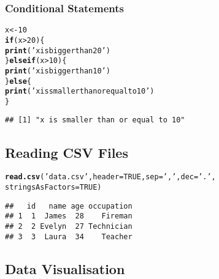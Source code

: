 \documentclass[../../dsa1101_notes.Rtex]{subfiles}\usepackage[]{graphicx}\usepackage[]{color}
\makeatletter
\newcommand{\hlnum}[1]{\textcolor[rgb]{0.686,0.059,0.569}{#1}}%
\newcommand{\hlstr}[1]{\textcolor[rgb]{0.192,0.494,0.8}{#1}}%
\newcommand{\hlopt}[1]{\textcolor[rgb]{0,0,0}{#1}}%
\newcommand{\hlstd}[1]{\textcolor[rgb]{0.345,0.345,0.345}{#1}}%
\newcommand{\hlkwa}[1]{\textcolor[rgb]{0.161,0.373,0.58}{\textbf{#1}}}%
\newcommand{\hlkwb}[1]{\textcolor[rgb]{0.69,0.353,0.396}{#1}}%
\newcommand{\hlkwc}[1]{\textcolor[rgb]{0.333,0.667,0.333}{#1}}%
\newcommand{\hlkwd}[1]{\textcolor[rgb]{0.737,0.353,0.396}{\textbf{#1}}}%
\newenvironment{kframe}{%
 \def\at@end@of@kframe{}%
 \ifinner\ifhmode%
  \def\at@end@of@kframe{\end{minipage}}%
  \begin{minipage}{\columnwidth}%
 \fi\fi%
 \def\FrameCommand##1{\hskip\@totalleftmargin \hskip-\fboxsep
 \colorbox{shadecolor}{##1}\hskip-\fboxsep
     \hskip-\linewidth \hskip-\@totalleftmargin \hskip\columnwidth}%
 \MakeFramed {\advance\hsize-\width
   \@totalleftmargin\z@ \linewidth\hsize
   \@setminipage}}%
 {\par\unskip\endMakeFramed%
 \at@end@of@kframe}
\newenvironment{knitrout}{}{} %
\makeatother
\begin{document}
\subsubsection{Conditional Statements}
\begin{knitrout}
\color{fgcolor}\begin{kframe}
\begin{alltt}
  \hlstd{x} \hlkwb{<-} \hlnum{10}
\hlkwa{if} \hlstd{(x} \hlopt{>} \hlnum{20}\hlstd{) \{}
  \hlkwd{print}\hlstd{(}\hlstr{'x is bigger than 20'}\hlstd{)}
\hlstd{\}} \hlkwa{else if} \hlstd{(x} \hlopt{>} \hlnum{10}\hlstd{) \{}
  \hlkwd{print}\hlstd{(}\hlstr{'x is bigger than 10'}\hlstd{)}
\hlstd{\}} \hlkwa{else} \hlstd{\{}
  \hlkwd{print}\hlstd{(}\hlstr{'x is smaller than or equal to 10'}\hlstd{)}
\hlstd{\}}
\end{alltt}
\begin{verbatim}
## [1] "x is smaller than or equal to 10"
\end{verbatim}
\end{kframe}
\end{knitrout}
  
  \subsection{Reading CSV Files}
\begin{knitrout}
\color{fgcolor}\begin{kframe}
\begin{alltt}
  \hlkwd{read.csv}\hlstd{(}\hlstr{'data.csv'}\hlstd{,} \hlkwc{header} \hlstd{=} \hlnum{TRUE}\hlstd{,} \hlkwc{sep} \hlstd{=} \hlstr{','}\hlstd{,} \hlkwc{dec} \hlstd{=} \hlstr{'.'}\hlstd{,}
           \hlkwc{stringsAsFactors} \hlstd{=} \hlnum{TRUE}\hlstd{)}
\end{alltt}
\begin{verbatim}
##   id   name age occupation
## 1  1  James  28    Fireman
## 2  2 Evelyn  27 Technician
## 3  3  Laura  34    Teacher
\end{verbatim}
\end{kframe}
\end{knitrout}
  
  \subsection{Data Visualisation}
\end{document}
